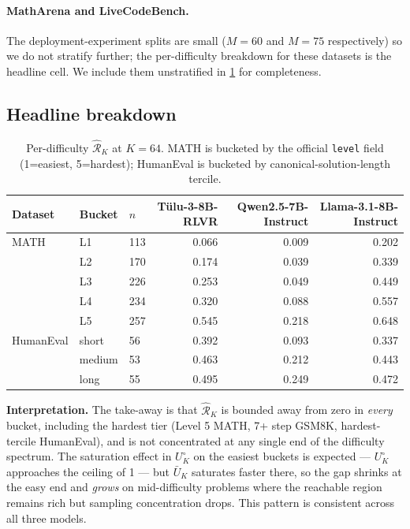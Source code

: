 \paragraph{MathArena and LiveCodeBench.}
The deployment-experiment splits are small ($M{=}60$ and $M{=}75$
respectively) so we do not stratify further; the per-difficulty
breakdown for these datasets is the headline cell. We include them
unstratified in \cref{tab:appendix_per_difficulty} for completeness.

\subsection{Headline breakdown}

\begin{table}[htbp]
\centering
\small
\setlength{\tabcolsep}{5pt}
\caption{Per-difficulty $\hat{\mathcal R}_K$ at $K{=}64$. MATH is bucketed by the official \texttt{level} field (1=easiest, 5=hardest); HumanEval is bucketed by canonical-solution-length tercile.}
\label{tab:appendix_per_difficulty}
\begin{tabular}{lll rrr}
\toprule
Dataset & Bucket & $n$ & Tülu-3-8B-RLVR & Qwen2.5-7B-Instruct & Llama-3.1-8B-Instruct \\
\midrule
MATH & L1 & 113 & 0.066 & 0.009 & 0.202 \\
 & L2 & 170 & 0.174 & 0.039 & 0.339 \\
 & L3 & 226 & 0.253 & 0.049 & 0.449 \\
 & L4 & 234 & 0.320 & 0.088 & 0.557 \\
 & L5 & 257 & 0.545 & 0.218 & 0.648 \\
\midrule
HumanEval & short & 56 & 0.392 & 0.093 & 0.337 \\
 & medium & 53 & 0.463 & 0.212 & 0.443 \\
 & long & 55 & 0.495 & 0.249 & 0.472 \\
\bottomrule
\end{tabular}
\end{table}

\textbf{Interpretation.} The take-away is that $\hat{\mathcal R}_K$ is bounded
away from zero in \emph{every} bucket, including the hardest tier
(Level 5 MATH, 7+ step GSM8K, hardest-tercile HumanEval), and is
not concentrated at any single end of the difficulty spectrum. The
saturation effect in $U^\circ_K$ on the easiest buckets is expected —
$U^\circ_K$ approaches the ceiling of 1 — but $\bar U_K$ saturates faster
there, so the gap shrinks at the easy end and \emph{grows} on
mid-difficulty problems where the reachable region remains rich but
sampling concentration drops. This pattern is consistent across all
three models.

